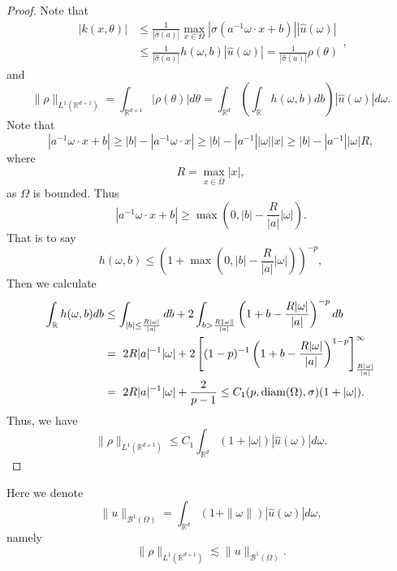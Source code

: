 \begin{proof}
Note that
\begin{equation}
\label{eq:4}
\begin{aligned}
|k(x,\theta)| &\le \frac{1}{ |\hat \sigma(a)|} \max_{x\in \Omega} |\sigma\left(a^{-1}{\omega}\cdot
x+b\right) | |\hat u(\omega)|  \\
&\le  \frac{1}{ |\hat \sigma(a)|}  h(\omega, b)|\hat u(\omega)|   =  \frac{1}{  |\hat \sigma(a)|} \rho(\theta)
\end{aligned},
\end{equation}
and
	\begin{equation}\label{key}
	\|\rho\|_{L^1(\mathbb{R}^{d+1})} = \int_{\mathbb{R}^{d+1}} |\rho(\theta)|d\theta = \int_{\mathbb{R}^d} \left( \int_{\mathbb{R}} h(\omega, b)db\right) |\hat u(\omega)| d\omega.
	\end{equation}
Note that
\begin{equation}\label{key}
|a^{-1}\omega \cdot x + b| \ge |b| - |a^{-1}\omega \cdot x | \ge  |b| - |a^{-1}||\omega| | x|  \ge |b| - |a^{-1}| |\omega | R,
\end{equation}
where 
\begin{equation}\label{key}
R = \max_{x\in \bar \Omega} |x|,
\end{equation}
as $\Omega$ is bounded.
Thus
\begin{equation}\label{key}
|a^{-1}\omega \cdot x + b| \ge \max(0, |b| - \frac{R}{|a|} |\omega |).
\end{equation}
That is to say
\begin{equation}\label{key}
h(\omega, b) \le (1+  \max(0, |b| - \frac{R}{|a|}|\omega|))^{-p},
\end{equation}
	Then we calculate
	\begin{equation}\label{eq_775}
	\begin{split}
	\int_\mathbb{R} h(\omega,b)db& \le \int_{|b|\leq \frac{R|\omega|}{|a|}} db + 2\int_{b > \frac{R\|\omega\|}{|a|}} \left(1 + b - \frac{R|\omega|}{|a|}\right)^{-p}db \\
	& =~2R|a|^{-1}|\omega| + 2\left[(1-p)^{-1}\left(1 + b - \frac{R|\omega|}{|a|}\right)^{1-p}\right]_{\frac{R|\omega|}{|a|}}^\infty \\
	&=~2R|a|^{-1}|\omega| + \frac{2}{p-1}\leq C_1(p,\text{\normalfont diam}(\Omega),\sigma) (1 + |\omega|).
	\end{split}
	\end{equation}
	Thus, we have
	\begin{equation}\label{key}
		\|\rho\|_{L^1(\mathbb{R}^{d+1})} \le C_1\int_{\mathbb{R}^d} (1+|\omega|)|\hat u(\omega)| d\omega.
	\end{equation}
\end{proof}
Here we denote 
\begin{equation}\label{key}
\|u\|_{\mathcal B^1(\Omega)} = \int_{\mathbb{R}^d} (1+\|\omega\|)|\hat u(\omega)| d\omega,
\end{equation}
namely
\begin{equation}\label{key}
\|\rho\|_{L^1(\mathbb{R}^{d+1})} \lesssim \|u\|_{\mathcal B^1(\Omega)}.
\end{equation}

